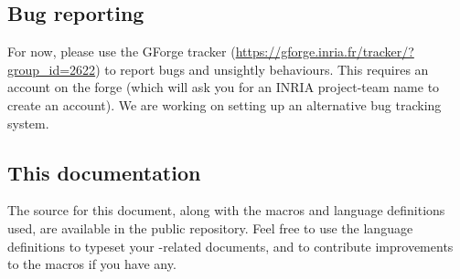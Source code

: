 \subsection{Bug reporting}
For now, please use the GForge tracker
(\url{https://gforge.inria.fr/tracker/?group_id=2622}) to report bugs and
unsightly behaviours. This requires an account on the forge (which will ask you
for an INRIA project-team name %
to create an account). We are working on setting up an alternative bug tracking
system.

\subsection{This documentation}
The source for this document, along with the macros and language definitions
used, are available in the public repository. Feel free to use the language
definitions to typeset your \EasyCrypt-related documents, and to contribute
improvements to the macros if you have any.

